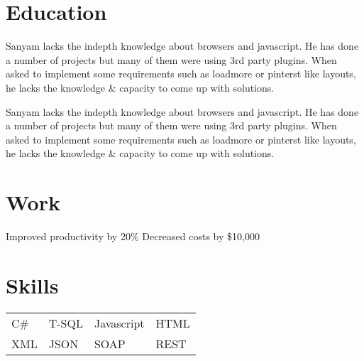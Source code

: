 \documentclass{cv}
\begin{document}
 

\section{Education}
\begin{description}[leftmargin=55pt,labelwidth=50pt]
  \item[B.Tech] Sanyam lacks the indepth knowledge about browsers and javascript.  He has done a number of projects but many of them were using 3rd party plugins.  When asked to implement some requirements such as loadmore or pinterst like layouts, he lacks the knowledge \& capacity to come up with solutions.
  \item[B.Tech] Sanyam lacks the indepth knowledge about browsers and javascript.  He has done a number of projects but many of them were using 3rd party plugins.  When asked to implement some requirements such as loadmore or pinterst like layouts, he lacks the knowledge \& capacity to come up with solutions.
\end{description}
 
\section{Work}
{Improved productivity by 20\%}
{Decreased costs by \$10,000}

\section{Skills}

\begin{tabular}{l l l l}
C\# & T-SQL & Javascript & HTML \\
XML & JSON & SOAP & REST
\end{tabular}
 
\end{document}
